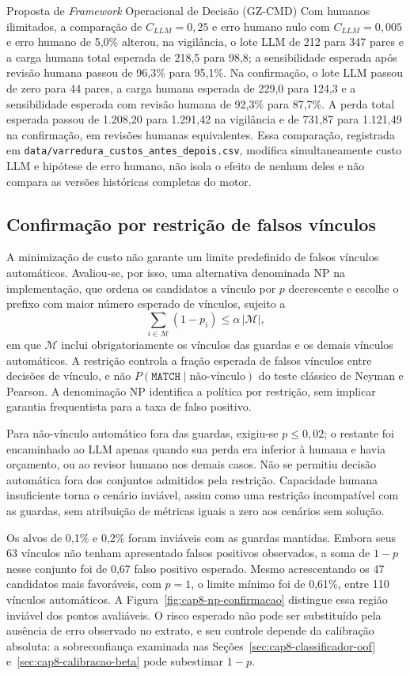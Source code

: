 \begin{chapter}{Proposta de \textit{Framework} Operacional de Decisão (GZ-CMD)}
Com humanos ilimitados, a comparação de $C_{LLM}=0{,}25$ e erro humano nulo com $C_{LLM}=0{,}005$ e erro humano de 5,0\% alterou, na vigilância, o lote LLM de 212 para 347 pares e a carga humana total esperada de 218,5 para 98,8; a sensibilidade esperada após revisão humana passou de 96,3\% para 95,1\%. Na confirmação, o lote LLM passou de zero para 44 pares, a carga humana esperada de 229,0 para 124,3 e a sensibilidade esperada com revisão humana de 92,3\% para 87,7\%. A perda total esperada passou de 1.208,20 para 1.291,42 na vigilância e de 731,87 para 1.121,49 na confirmação, em revisões humanas equivalentes. Essa comparação, registrada em \texttt{data/varredura\_custos\_antes\_depois.csv}, modifica simultaneamente custo LLM e hipótese de erro humano, não isola o efeito de nenhum deles e não compara as versões históricas completas do motor.

\subsection{Confirmação por restrição de falsos vínculos}
\label{sec:cap8-np-confirmacao}

A minimização de custo não garante um limite predefinido de falsos vínculos automáticos. Avaliou-se, por isso, uma alternativa denominada NP na implementação, que ordena os candidatos a vínculo por $p$ decrescente e escolhe o prefixo com maior número esperado de vínculos, sujeito a
\[
\sum_{i\in\mathcal{M}}(1-p_i)\leq\alpha\,|\mathcal{M}|,
\]
em que $\mathcal{M}$ inclui obrigatoriamente os vínculos das guardas e os demais vínculos automáticos. A restrição controla a fração esperada de falsos vínculos entre decisões de vínculo, e não $P(\texttt{MATCH}\mid\text{não-vínculo})$ do teste clássico de Neyman e Pearson. A denominação NP identifica a política por restrição, sem implicar garantia frequentista para a taxa de falso positivo.

Para não-vínculo automático fora das guardas, exigiu-se $p\leq0{,}02$; o restante foi encaminhado ao LLM apenas quando sua perda era inferior à humana e havia orçamento, ou ao revisor humano nos demais casos. Não se permitiu decisão automática fora dos conjuntos admitidos pela restrição. Capacidade humana insuficiente torna o cenário inviável, assim como uma restrição incompatível com as guardas, sem atribuição de métricas iguais a zero aos cenários sem solução.

Os alvos de 0,1\% e 0,2\% foram inviáveis com as guardas mantidas. Embora seus 63 vínculos não tenham apresentado falsos positivos observados, a soma de $1-p$ nesse conjunto foi de 0,67 falso positivo esperado. Mesmo acrescentando os 47 candidatos mais favoráveis, com $p=1$, o limite mínimo foi de 0,61\%, entre 110 vínculos automáticos. A Figura~\ref{fig:cap8-np-confirmacao} distingue essa região inviável dos pontos avaliáveis. O risco esperado não pode ser substituído pela ausência de erro observado no extrato, e seu controle depende da calibração absoluta: a sobreconfiança examinada nas Seções~\ref{sec:cap8-classificador-oof} e~\ref{sec:cap8-calibracao-beta} pode subestimar $1-p$.


\end{chapter}

